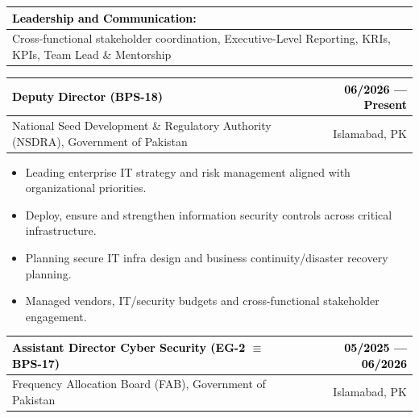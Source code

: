\documentclass{resume}
\begin{document}
\begin{tabularx}{\linewidth}{|X|}
    \hline
    \cellcolor{lightblue}\textcolor{black}{Leadership and Communication:} \\
    \hline
    Cross-functional stakeholder coordination, Executive-Level Reporting, KRIs, KPIs, Team Lead \& Mentorship \\
    \hline
\end{tabularx}
\vspace{0.01cm}
\begin{tabularx}{\linewidth}{|X|r|}
    \hline
    
    \cellcolor{lightblue}\textcolor{black}{Deputy Director \space (BPS-18)} & 
    \cellcolor{lightblue}\textcolor{black}{06/2026 --- Present} \\
    \hline
    
    National Seed Development \& Regulatory Authority (NSDRA), Government of Pakistan & Islamabad, PK \\
    \hline
\end{tabularx}

\begin{itemize}
\item {} Leading enterprise IT strategy and risk management aligned with organizational priorities.
\item {} Deploy, ensure and strengthen information security controls across critical infrastructure.
\item {} Planning secure IT infra design and business continuity/disaster recovery planning.
\item {} Managed vendors, IT/security budgets and cross-functional stakeholder engagement.
\end{itemize} 
 \vspace{-0.2cm} 
\divider

\begin{tabularx}{\linewidth}{|X|r|}
    \hline
    
    \cellcolor{lightblue}\textcolor{black}{Assistant Director Cyber Security \space (EG-2 $\equiv$ BPS-17)} & 
    \cellcolor{lightblue}\textcolor{black}{05/2025 --- 06/2026} \\
    \hline
    
    Frequency Allocation Board (FAB), Government of Pakistan & Islamabad, PK \\
    \hline
\end{tabularx}
 
\end{document}
